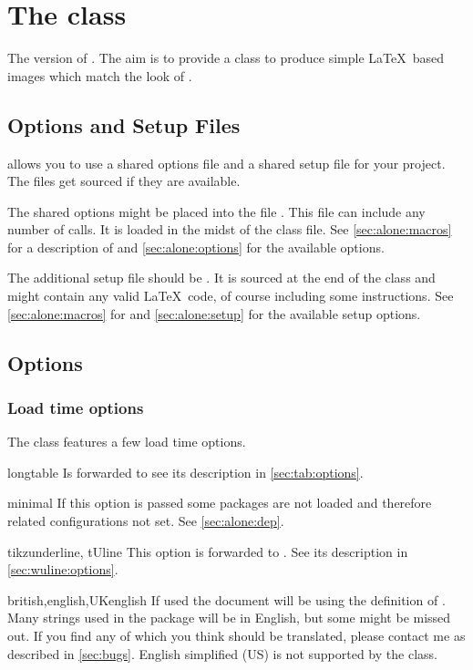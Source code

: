 \chapter{The  class}
The  version of . The aim is to provide a class
to produce simple \LaTeX\ based images which match the look of .

\section{Options and Setup Files}\label{sec:alone:files}%
 allows you to use a shared options file and a shared setup file
for your project. The files get sourced if they are available.

The shared options might be placed into the file .
This file can include any number of  calls. It is loaded in
the midst of the class file. See \autoref{sec:alone:macros} for a description of
 and \autoref{sec:alone:options} for the available options.

The additional setup file should be . It is sourced
at the end of the class and might contain any valid \LaTeX\ code, of course
including some  instructions. See \autoref{sec:alone:macros}
for  and \autoref{sec:alone:setup} for the available setup
options.

\section{Options}%
\subsection{Load time options}\label{sec:alone:options}%
The class features a few load time options.
\begin{describeopt}{longtable}
  Is forwarded to  see its description in \autoref{sec:tab:options}.
\end{describeopt}
\begin{describeopt}{minimal}
  If this option is passed some packages are not loaded and therefore related
  configurations not set. See \autoref{sec:alone:dep}.
\end{describeopt}
\begin{describeopt}{tikzunderline, tUline}
  This option is forwarded to . See its description in
  \autoref{sec:wuline:options}.
\end{describeopt}
\begin{describeopt}{british,english,UKenglish}
  If used the document will be using the  definition of
  . Many strings used in the package will be in English, but some
  might be missed out. If you find any of which you think should be translated,
  please contact me as described in \autoref{sec:bugs}. English simplified (US)
  is not supported by the class.
\end{describeopt}


